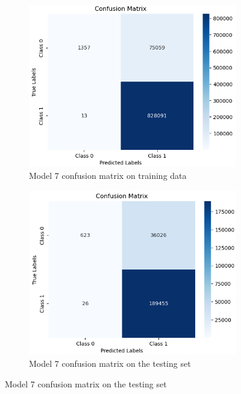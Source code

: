 \begin{figure}[H]%
    \centering
    \begin{subfigure}{0.49\textwidth}
        \centering
        \includegraphics[width=\linewidth]{figures/ev/do_3_cm1.png}
        \caption{Model 7 confusion matrix on training data}
    \label{fig:do_3_cm1}
    \end{subfigure}
    \begin{subfigure}{0.49\textwidth}
        \centering
         \includegraphics[width=\linewidth]{figures/ev/do_3_cm2.png}
        \caption{Model 7 confusion matrix on the testing set}
    \label{fig:do_3_cm2}
    \end{subfigure}

\end{figure}

